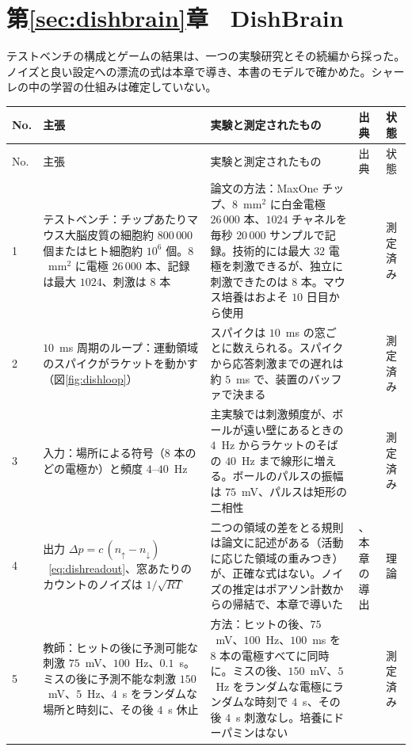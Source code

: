 \section{第\ref{sec:dishbrain}章　DishBrain}

テストベンチの構成とゲームの結果は、一つの実験研究とその続編から採った。ノイズと良い設定への漂流の式は本章で導き、本書のモデルで確かめた。シャーレの中の学習の仕組みは確定していない。

{\footnotesize
\setlength{\tabcolsep}{3pt}\renewcommand{\arraystretch}{1.15}
\begin{longtable}{>{\raggedright}p{0.5cm}>{\raggedright}p{4.0cm}>{\raggedright}p{5.6cm}>{\raggedright}p{2.3cm}>{\raggedright\arraybackslash}p{1.7cm}}
\toprule
No. & 主張 & 実験と測定されたもの & 出典 & 状態 \\
\midrule\endfirsthead
\toprule
No. & 主張 & 実験と測定されたもの & 出典 & 状態 \\
\midrule\endhead
1 & テストベンチ：チップあたりマウス大脳皮質の細胞約 $800\,000$ 個またはヒト細胞約 $10^6$ 個。$8$~mm$^2$ に電極 $26\,000$ 本、記録は最大 $1024$、刺激は $8$ 本 & 論文の方法：MaxOne チップ、$8$~mm$^2$ に白金電極 $26\,000$ 本、$1024$ チャネルを毎秒 $20\,000$ サンプルで記録。技術的には最大 $32$ 電極を刺激できるが、独立に刺激できたのは $8$ 本。マウス培養はおよそ $10$ 日目から使用 & \cite{Kagan2022} & 測定済み \\
2 & $10$~ms 周期のループ：運動領域のスパイクがラケットを動かす（図\ref{fig:dishloop}） & スパイクは $10$~ms の窓ごとに数えられる。スパイクから応答刺激までの遅れは約 $5$~ms で、装置のバッファで決まる & \cite{Kagan2022} & 測定済み \\
3 & 入力：場所による符号（$8$ 本のどの電極か）と頻度 $4$--$40$~Hz & 主実験では刺激頻度が、ボールが遠い壁にあるときの $4$~Hz からラケットのそばの $40$~Hz まで線形に増える。ボールのパルスの振幅は $75$~mV、パルスは矩形の二相性 & \cite{Kagan2022} & 測定済み \\
4 & 出力 $\Delta p=c\,(n_\uparrow-n_\downarrow)$~\eqref{eq:dishreadout}、窓あたりのカウントのノイズは $1/\sqrt{RT}$ & 二つの領域の差をとる規則は論文に記述がある（活動に応じた領域の重みつき）が、正確な式はない。ノイズの推定はポアソン計数からの帰結で、本章で導いた & \cite{Kagan2022}、本章の導出 & 理論 \\
5 & 教師：ヒットの後に予測可能な刺激 $75$~mV、$100$~Hz、$0.1$~s。ミスの後に予測不能な刺激 $150$~mV、$5$~Hz、$4$~s をランダムな場所と時刻に、その後 $4$~s 休止 & 方法：ヒットの後、$75$~mV、$100$~Hz、$100$~ms を $8$ 本の電極すべてに同時に。ミスの後、$150$~mV、$5$~Hz をランダムな電極にランダムな時刻で $4$~s、その後 $4$~s 刺激なし。培養にドーパミンはない & \cite{Kagan2022} & 測定済み \\

\end{longtable}}
